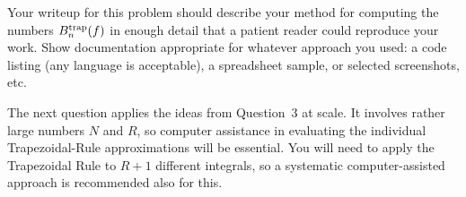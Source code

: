 \documentclass{exam}
\newcommand\starscore[2]{%
  \pgfmathsetmacro\pgfxa{#1 + 1}%
  \tikzstyle{scorestars}=[star, star points=5, star point ratio=2.5, draw, inner sep=0.12em, anchor=outer point 3]%
  \begin{tikzpicture}[baseline=2pt]
    \foreach \i in {1, ..., #2} {
      \pgfmathparse{\i<=#1 ? "black" : "white"}
      \edef\starcolor{\pgfmathresult}
      \draw (\i*1em, 0) node[name=star\i, scorestars, fill=\starcolor, semithick]  {};
    }
    \pgfmathparse{#1>int(#1) ? int(#1+1) : 0}
    \let\partstar=\pgfmathresult
    \ifnum\partstar>0
      \pgfmathsetmacro\starpart{#1-(int(#1)}
      \path [clip] ($(star\partstar.outer point 3)!(star\partstar.outer point 2)!(star\partstar.outer point 4)$) rectangle 
      ($(star\partstar.outer point 2 |- star\partstar.outer point 1)!\starpart!(star\partstar.outer point 1 -| star\partstar.outer point 5)$);
      \fill (\partstar*1em, 0) node[scorestars, fill=black]  {};
    \fi
  \end{tikzpicture}%
}
\begin{document}
\begin{questions}

Your writeup for this problem should describe your method 
for computing the numbers $B_n^{\rm trap}(f)$
in enough detail that a patient reader could reproduce your work.
Show documentation appropriate for whatever approach you used:
a code listing (any language is acceptable), 
a spreadsheet sample,
or selected screenshots, etc.

\begin{EnvUplevel}
The next question applies the ideas from Question~3 at scale.
It involves rather large numbers $N$ and $R$, 
so computer assistance in evaluating
the individual Trapezoidal-Rule approximations will be essential.
You will need to apply the Trapezoidal Rule to $R+1$ different integrals,
so a systematic computer-assisted approach is recommended also for this.
\end{EnvUplevel}


\end{questions}
\end{document}
